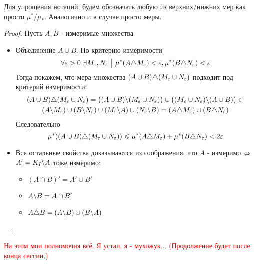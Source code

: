 \begin{note}
	Для упрощения нотаций, будем обозначать любую из верхних/нижних мер как просто $\mu^*$/$\mu_*$. Аналогично и в случае просто меры.
\end{note}

\begin{proof}
	Пусть $A, B$ - измеримые множества
	\begin{itemize}
		\item Объединение $A \cup B$. По критерию измеримости
		\[
			\forall \varepsilon > 0\ \exists M_\varepsilon, N_\varepsilon \ \big|\  \mu^*(A \triangle M_\varepsilon) < \varepsilon, \mu^*(B \triangle N_\varepsilon) < \varepsilon
		\]
		Тогда покажем, что мера множества $(A \cup B) \triangle (M_\varepsilon \cup N_\varepsilon)$ подходит под критерий измеримости:
		\begin{multline*}
			(A \cup B) \triangle (M_\varepsilon \cup N_\varepsilon) = \big((A \cup B) \backslash (M_\varepsilon \cup N_\varepsilon)\big) \cup \big((M_\varepsilon \cup N_\varepsilon) \backslash (A \cup B)\big) \subset
			\\
			(A \backslash M_\varepsilon) \cup (B \backslash N_\varepsilon) \cup (M_\varepsilon \backslash A) \cup (N_\varepsilon \backslash B) = (A \triangle M_\varepsilon) \cup (B \triangle N_\varepsilon)
		\end{multline*}
		Следовательно
		\[
			\mu^*((A \cup B) \triangle (M_\varepsilon \cup N_\varepsilon)) \leqslant \mu^*(A \triangle M_\varepsilon) + \mu^*(B \triangle N_\varepsilon) < 2\varepsilon
		\]
		
		\item Все остальные свойства доказываются из соображения, что $A$ - измеримо $\Leftrightarrow$ $A' = K_I \backslash A$ тоже измеримо:
		\begin{itemize}
			\item \((A \cap B)' = A' \cup B'\)
			
			\item \(A \backslash B = A \cap B'\)
			
			\item \(A \triangle B = (A \backslash B) \cup (B \backslash A)\)
		\end{itemize}
	\end{itemize}
\end{proof}

\textcolor{red}{На этом мои полномочия всё. Я устал, я - мухожук... (Продолжение будет после конца сессии.)}